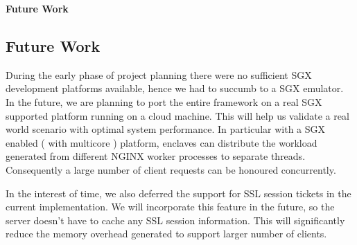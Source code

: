 \documentclass[../main.tex]{subfiles}
\begin{document}
\textbf{Future Work}
\subsection{Future Work}

During the early phase of project planning there were no sufficient SGX development platforms available, hence we had to succumb to a SGX emulator. In the future, we are planning  to port the entire framework on a real SGX supported platform running on a cloud machine. This will help us validate a real world scenario with optimal system performance. In particular with a SGX enabled ( with multicore ) platform, enclaves can distribute the workload generated from different NGINX worker processes to separate threads. Consequently a large number of client requests can be honoured concurrently. 

In the interest of time, we also deferred the support for SSL session tickets in the current implementation. We will  incorporate this feature in the future, so the server doesn’t have to cache any SSL session information. This will significantly reduce the memory overhead generated to support larger number of clients. 
 
\end{document}

